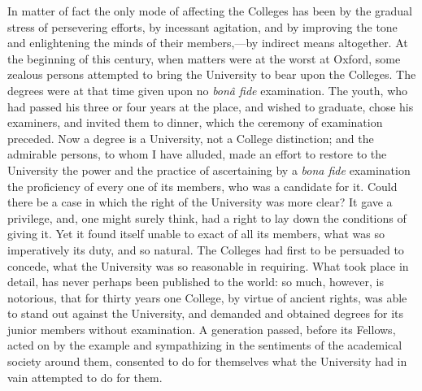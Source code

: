 In matter of fact the only
mode of affecting the Colleges has been by the gradual stress of
persevering efforts, by incessant agitation, and by improving the tone
and enlightening the minds of their members,—by indirect means
altogether. At the beginning of this century, when matters were at the
worst at Oxford, some zealous persons attempted to bring the
University to bear upon the Colleges. The degrees were at that time
given upon no \emph{bonâ fide} examination. The youth, who had passed
his three or four years at the place, and wished to graduate, chose
his examiners, and invited them to dinner, which the ceremony of
examination preceded. Now a degree is a University, not a College
distinction; and the admirable persons, to whom I have alluded, made
an effort to restore to the University the power and the practice of
ascertaining by a \emph{bona fide} examination the proficiency of
every one of its members, who was a candidate for it. Could there be a
case in which the right of the University was more clear? It gave a
privilege, and, one might surely think, had a right to lay down the
conditions of giving it. Yet it found itself unable to exact of all
its members, what was so imperatively its duty, and so natural. The
Colleges had first to be persuaded to concede, what the University was
so reasonable in requiring. What took place in detail, has never
perhaps been published to the world: so much, however, is notorious,
that for thirty years one College, by virtue of ancient rights,
was able to stand out against the University, and demanded and
obtained degrees for its junior members without examination. A
generation passed, before its Fellows, acted on by the example and
sympathizing in the sentiments of the academical society around them,
consented to do for themselves what the University had in vain
attempted to do for them.

